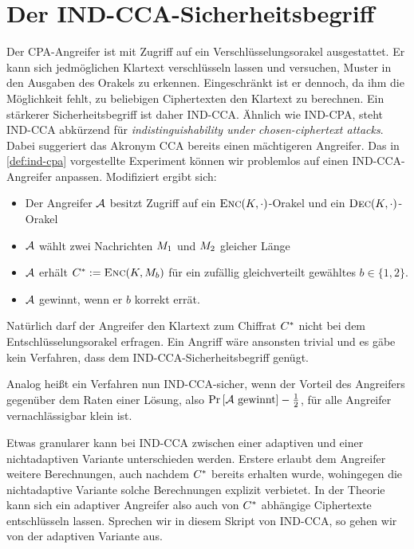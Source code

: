 \section{Der IND-CCA-Sicherheitsbegriff}
Der CPA-Angreifer ist mit Zugriff auf ein Verschlüsselungsorakel ausgestattet. Er kann sich jedmöglichen Klartext verschlüsseln lassen und
versuchen, Muster in den Ausgaben des Orakels zu erkennen. Eingeschränkt ist er dennoch, da ihm die Möglichkeit fehlt, zu beliebigen
Ciphertexten den Klartext zu berechnen. Ein stärkerer Sicherheitsbegriff ist daher IND-CCA. Ähnlich wie IND-CPA, steht IND-CCA abkürzend für \emph{indistinguishability under chosen-ciphertext attacks}. Dabei suggeriert das Akronym CCA bereits einen mächtigeren Angreifer. Das in \ref{def:ind-cpa} vorgestellte Experiment können wir problemlos auf einen IND-CCA-Angreifer anpassen. Modifiziert ergibt sich:

\begin{itemize}
	\item Der Angreifer $\mathcal{A}$ besitzt Zugriff auf ein $\textsc{Enc}(K,\cdot)$-Orakel und ein $\textsc{Dec}(K,\cdot)$-Orakel
	\item $\mathcal{A}$ wählt zwei Nachrichten $M_1$ und $M_2$ gleicher Länge
	\item $\mathcal{A}$ erhält $C^{*} := \textsc{Enc}(K, M_{b})$  für ein zufällig gleichverteilt gewähltes $b \in \{1, 2\}$.
	\item $\mathcal{A}$ gewinnt, wenn er $b$ korrekt errät.
\end{itemize} 

Natürlich darf der Angreifer den Klartext zum Chiffrat $C^{*}$ nicht bei dem Entschlüsselungsorakel erfragen. Ein Angriff wäre ansonsten trivial und es gäbe kein Verfahren, dass dem IND-CCA-Sicherheitsbegriff genügt. 

Analog heißt ein Verfahren nun IND-CCA-sicher, wenn der Vorteil des Angreifers gegenüber dem Raten einer Lösung, also $\text{Pr} \left[ \mathcal{A}\ \text{gewinnt} \right] - \frac{1}{2}$, für alle Angreifer vernachlässigbar klein ist.

Etwas granularer kann bei IND-CCA zwischen einer adaptiven und einer nichtadaptiven Variante unterschieden werden. Erstere erlaubt dem Angreifer weitere Berechnungen, auch nachdem $C^{*}$ bereits erhalten wurde, wohingegen die nichtadaptive Variante solche Berechnungen explizit verbietet. In der Theorie kann sich ein adaptiver Angreifer also auch von $C^{*}$ abhängige Ciphertexte entschlüsseln lassen. Sprechen wir in diesem Skript von IND-CCA, so gehen wir von der adaptiven Variante aus.

